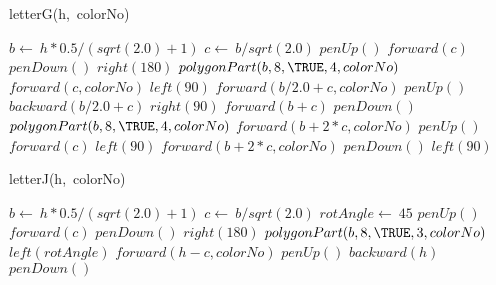 \documentclass[a4paper,10pt]{article}
\begin{document}
\begin{algorithm}
\caption{letterG(h,\ colorNo)}
\begin{algorithmic}[5]

\STATE {}
\STATE {}
  \STATE \(b\gets\ h*0.5/(sqrt(2.0)+1)\)
  \STATE \(c\gets\ b/sqrt(2.0)\)
  \STATE \(penUp()\)
  \STATE \(forward(c)\)
  \STATE \(penDown()\)
  \STATE \(right(180)\)
  \STATE {}
  \STATE {}
  \STATE \(polygonPart(b,8,\TRUE,4,colorNo)\)
  \STATE \(forward(c,colorNo)\)
  \STATE \(left(90)\)
  \STATE \(forward(b/2.0+c,colorNo)\)
  \STATE \(penUp()\)
  \STATE \(backward(b/2.0+c)\)
  \STATE \(right(90)\)
  \STATE \(forward(b+c)\)
  \STATE \(penDown()\)
  \STATE {}
  \STATE {}
  \STATE \(polygonPart(b,8,\TRUE,4,colorNo)\)
  \STATE \(forward(b+2*c,colorNo)\)
  \STATE \(penUp()\)
  \STATE \(forward(c)\)
  \STATE \(left(90)\)
  \STATE \(forward(b+2*c,colorNo)\)
  \STATE \(penDown()\)
  \STATE \(left(90)\)

\end{algorithmic}
\end{algorithm}


\begin{algorithm}
\caption{letterJ(h,\ colorNo)}
\begin{algorithmic}[5]

\STATE {}
\STATE {}
  \STATE \(b\gets\ h*0.5/(sqrt(2.0)+1)\)
  \STATE \(c\gets\ b/sqrt(2.0)\)
  \STATE \(rotAngle\gets\ 45\)
  \STATE \(penUp()\)
  \STATE \(forward(c)\)
  \STATE \(penDown()\)
  \STATE \(right(180)\)
  \STATE {}
  \STATE {}
  \STATE \(polygonPart(b,8,\TRUE,3,colorNo)\)
  \STATE \(left(rotAngle)\)
  \STATE \(forward(h-c,colorNo)\)
  \STATE \(penUp()\)
  \STATE \(backward(h)\)
  \STATE \(penDown()\)

\end{algorithmic}
\end{algorithm}
\end{document}
